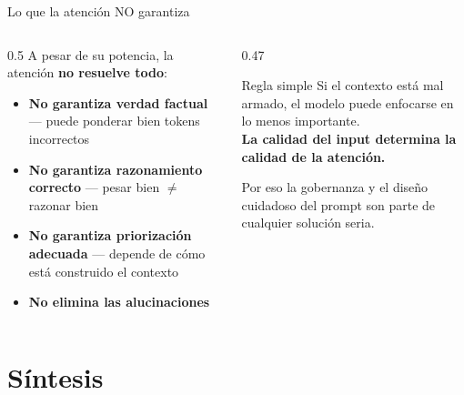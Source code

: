 \documentclass[aspectratio=169, 10pt]{beamer}
\newcommand{\highlight}[1]{\textcolor{fenred}{\textbf{#1}}}
\begin{document}
\begin{frame}{Lo que la atención NO garantiza}

  \begin{columns}[T]
    \begin{column}{0.5\textwidth}
      A pesar de su potencia, la atención \textbf{no resuelve todo}:
      \vspace{0.4em}
      \begin{itemize}
        \item \highlight{No garantiza verdad factual} --- puede ponderar bien tokens incorrectos
        \item \highlight{No garantiza razonamiento correcto} --- pesar bien $\neq$ razonar bien
        \item \highlight{No garantiza priorización adecuada} --- depende de cómo está construido el contexto
        \item \highlight{No elimina las alucinaciones}
      \end{itemize}
    \end{column}
    \begin{column}{0.47\textwidth}
      \begin{alertblock}{Regla simple}
        Si el contexto está mal armado, el modelo puede enfocarse en lo menos importante.\\[0.4em]
        \textbf{La calidad del input determina la calidad de la atención.}
      \end{alertblock}
      \vspace{0.3em}
      Por eso la gobernanza y el diseño cuidadoso del prompt son parte de cualquier solución seria.
    \end{column}
  \end{columns}

\end{frame}

\section{Síntesis}
\end{document}
